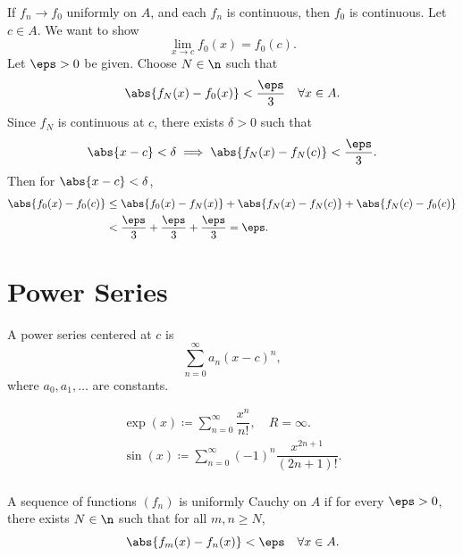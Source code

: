 

\begin{theorem}{
    If $f_n \to f_0$ uniformly on $A$, and each $f_n$ is continuous, then $f_0$ is continuous.
}
    Let $c \in A$.
    We want to show
    \[
        \lim_{x \to c} f_0(x) = f_0(c).
    \]
    Let $\eps > 0$ be given.
    Choose $N \in \n$ such that
    \[
        \abs{f_N(x) - f_0(x)} < \frac{\eps}{3} \quad \forall x \in A.
    \]
    Since $f_N$ is continuous at $c$, there exists $\delta > 0$ such that
    \[
        \abs{x - c} < \delta \implies \abs{f_N(x) - f_N(c)} < \frac{\eps}{3}.
    \]
    Then for $\abs{x - c} < \delta$,
    \begin{align*}
        \abs{f_0(x) - f_0(c)}
        &\leq \abs{f_0(x) - f_N(x)} + \abs{f_N(x) - f_N(c)} + \abs{f_N(c) - f_0(c)} \\
        &< \frac{\eps}{3} + \frac{\eps}{3} + \frac{\eps}{3} = \eps.
    \end{align*}
\end{theorem}

\section{Power Series}

\begin{definition}
    A power series centered at $c$ is
    \[
        \sum_{n=0}^\infty a_n (x-c)^n,
    \]
    where $a_0,a_1,\ldots$ are constants.
\end{definition}

\begin{example}
    \begin{gather*}
        \exp(x) \coloneqq \sum_{n=0}^\infty \dfrac{x^n}{n!}, \quad R = \infty.\\
        \sin(x) \coloneqq \sum_{n=0}^\infty (-1)^n \dfrac{x^{2n+1}}{(2n+1)!}.\\
    \end{gather*}
\end{example}

\begin{definition}
    A sequence of functions $(f_n)$ is uniformly Cauchy on $A$ if for every $\eps > 0$, there exists $N \in \n$ such that for all $m,n \geq N$,
    \[
        \abs{f_m(x) - f_n(x)} < \eps \quad \forall x \in A.
    \]
\end{definition}

